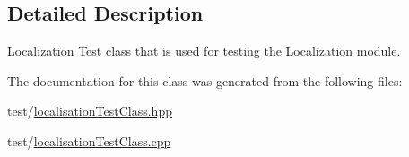 \subsection{Detailed Description}
Localization Test class that is used for testing the Localization module. 

The documentation for this class was generated from the following files\+:\begin{DoxyCompactItemize}
\item 
test/\hyperlink{localisationTestClass_8hpp}{localisation\+Test\+Class.\+hpp}\item 
test/\hyperlink{localisationTestClass_8cpp}{localisation\+Test\+Class.\+cpp}\end{DoxyCompactItemize}
